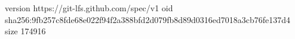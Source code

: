 version https://git-lfs.github.com/spec/v1
oid sha256:9fb257c8fde68e022f94f2a388bfd2d079fb8d89d0316ed7018a3cb76fe137d4
size 174916
